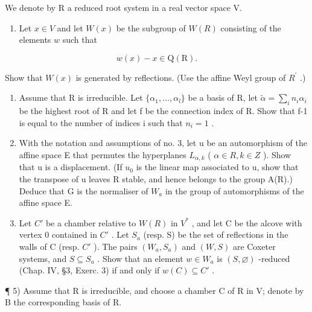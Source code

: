 
We denote by R a reduced root system in a real vector space V.

\begin{enumerate}
\def\labelenumi{\arabic{enumi})}
\tightlist
\item
  Let \(x \in V\) and let \(W(x)\) be the subgroup of \(W(R)\) consisting of the elements \(w\) such that
\end{enumerate}

\[
w (x) - x \in \mathrm{Q} (\mathrm{R}).
\]

Show that \(W(x)\) is generated by reflections. (Use the affine Weyl group of \(R^{\prime}\) .)

\begin{enumerate}
\def\labelenumi{\arabic{enumi})}
\setcounter{enumi}{1}
\item
  Assume that R is irreducible. Let \(\{\alpha_{1},\ldots,\alpha_{l}\}\) be a basis of R, let \(\tilde{\alpha}=\sum_{i}n_{i}\alpha_{i}\) be the highest root of R and let f be the connection index of R. Show that f-1 is equal to the number of indices i such that \(n_{i}=1\) .
\item
  With the notation and assumptions of no. 3, let u be an automorphism of the affine space E that permutes the hyperplanes \(L_{\alpha,k}\) ( \(\alpha \in R, k \in Z\) ). Show that u is a displacement. (If \(u_{0}\) is the linear map associated to u, show that the transpose of u leaves R stable, and hence belongs to the group A(R).) Deduce that G is the normaliser of \(W_{a}\) in the group of automorphisms of the affine space E.
\item
  Let \(C'\) be a chamber relative to \(W(R)\) in \(V^{*}\) , and let C be the alcove with vertex 0 contained in \(C'\) . Let \(S_{a}\) (resp. S) be the set of reflections in the walls of C (resp. \(C'\) ). The pairs \((W_{a}, S_{a})\) and \((W, S)\) are Coxeter systems, and \(S \subseteq S_{a}\) . Show that an element \(w \in W_{a}\) is \((S, \varnothing)\) -reduced (Chap. IV, §3, Exerc. 3) if and only if \(w(C) \subseteq C'\) .
\end{enumerate}

¶ 5) Assume that R is irreducible, and choose a chamber C of R in V; denote by B the corresponding basis of R.

